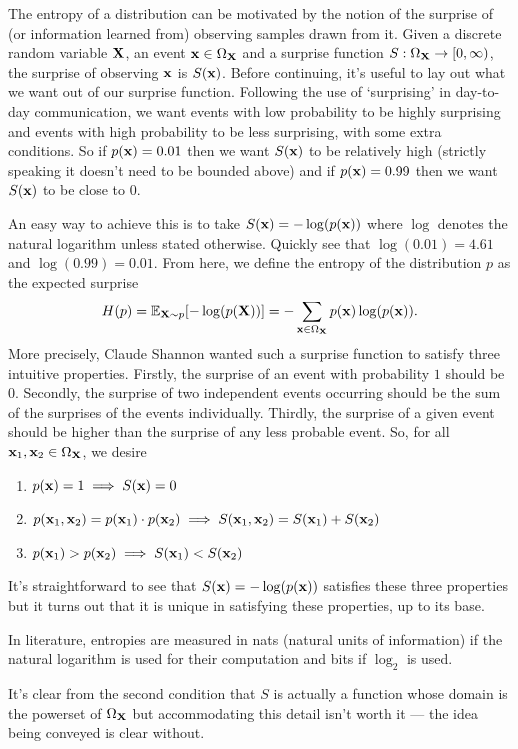\documentclass[11pt]{article}
\begin{document}
\begin{appendices}
The entropy of a distribution can be motivated by the notion of the surprise of (or information learned from) observing samples drawn from it. Given a discrete random variable $\mathbf{X}$, an event $\mathbf{x}\in\Omega_{\mathbf{X}}$ and a surprise function $S:\Omega_{\mathbf{X}}\rightarrow[0,\infty)$, the surprise of observing $\mathbf{x}$ is $S(\mathbf{x})$. Before continuing, it's useful to lay out what we want out of our surprise function. Following the use of `surprising' in day-to-day communication, we want events with low probability to be highly surprising and events with high probability to be less surprising, with some extra conditions. So if $p(\mathbf{x})=0.01$ then we want $S(\mathbf{x})$ to be relatively high (strictly speaking it doesn't need to be bounded above) and if $p(\mathbf{x})=0.99$ then we want $S(\mathbf{x})$ to be close to 0.

An easy way to achieve this is to take $S(\mathbf{x})=-\log(p(\mathbf{x}))$ where $\log$ denotes the natural logarithm unless stated otherwise. Quickly see that $\log(0.01)=4.61$ and $\log(0.99)=0.01$. From here, we define the entropy of the distribution $p$ as the expected surprise
$$
H(p)
=
\mathbb{E}_{\mathbf{X}\sim p}[-\log(p(\mathbf{X}))]
=
-\sum_{\mathbf{x}\in \Omega_{\mathbf{X}}}p(\mathbf{x})\log(p(\mathbf{x})).
$$
More precisely, Claude Shannon wanted such a surprise function to satisfy three intuitive properties. Firstly, the surprise of an event with probability $1$ should be $0$. Secondly, the surprise of two independent events occurring should be the sum of the surprises of the events individually. Thirdly, the surprise of a given event should be higher than the surprise of any less probable event. So, for all $\mathbf{x}_1,\mathbf{x}_2\in\Omega_{\mathbf{X}}$, we desire
\begin{enumerate}
    \item $p(\mathbf{x})=1\implies S(\mathbf{x})=0$
    \item $p(\mathbf{x}_1,\mathbf{x}_2)=p(\mathbf{x}_1)\cdot p(\mathbf{x}_2)\implies S(\mathbf{x}_1,\mathbf{x}_2)=S(\mathbf{x}_1)+S(\mathbf{x}_2)$
    \item $p(\mathbf{x}_1)>p(\mathbf{x}_2)\implies S(\mathbf{x}_1)<S(\mathbf{x}_2)$
\end{enumerate}
It's straightforward to see that $S(\mathbf{x})=-\log(p(\mathbf{x}))$ satisfies these three properties but it turns out that it is unique in satisfying these properties, up to its base.

In literature, entropies are measured in nats (natural units of information) if the natural logarithm is used for their computation and bits if $\log_2$ is used.

\begin{tcolorbox}[title={\centering\textbf{Technical note regarding} $\text{dom}(S)$}, colback=myLightBlue, colbacktitle=myDarkBlue, colframe=myDarkBlue, coltitle=white]
    It's clear from the second condition that $S$ is actually a function whose domain is the powerset of $\Omega_{\mathbf{X}}$ but accommodating this detail isn't worth it — the idea being conveyed is clear without.
\end{tcolorbox}


\end{appendices}
\end{document}
